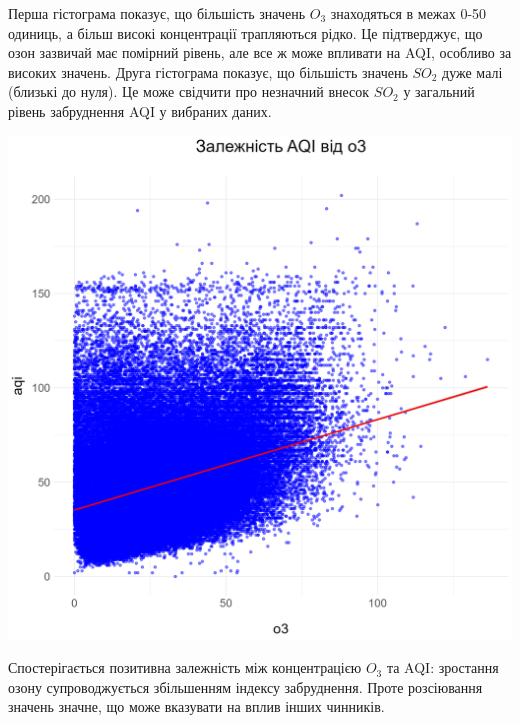 \documentclass{article}
\begin{document}
\begin{enumerate}
    Перша гістограма показує, що більшість значень $O_3$ знаходяться в межах 0-50 одиниць, а більш високі концентрації трапляються рідко.
    Це підтверджує, що озон зазвичай має помірний рівень, але все ж може впливати на AQI, особливо за високих значень.
    Друга гістограма показує, що більшість значень $SO_2$ дуже малі (близькі до нуля).
    Це може свідчити про незначний внесок $SO_2$ у загальний рівень забруднення AQI у вибраних даних.   
    
    \includegraphics[width=6in]{plots/question2/scatter_plot.png}
    
    Спостерігається позитивна залежність між концентрацією $O_3$ та AQI: зростання озону супроводжується збільшенням індексу забруднення.
    Проте розсіювання значень значне, що може вказувати на вплив інших чинників.
    

\end{enumerate}
\end{document}
